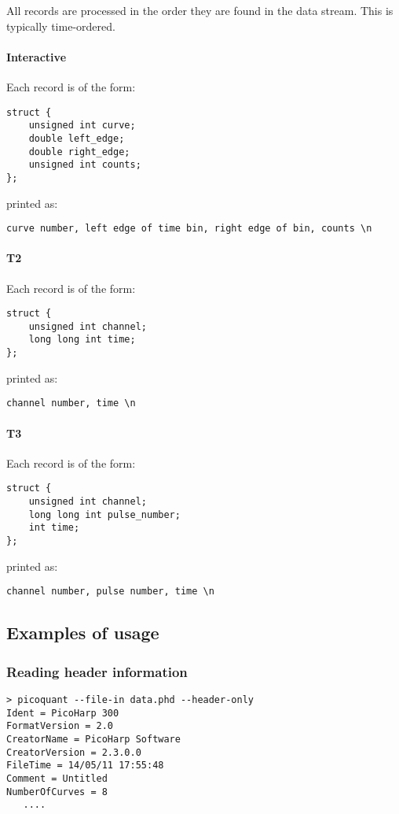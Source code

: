\documentclass{article}
\begin{document}
All records are processed in the order they are found in the data stream. This is typically time-ordered.

\paragraph{Interactive}
Each record is of the form:
\begin{verbatim}
struct {
    unsigned int curve;
    double left_edge;
    double right_edge;
    unsigned int counts;
};
\end{verbatim}
printed as:
\begin{verbatim}
curve number, left edge of time bin, right edge of bin, counts \n
\end{verbatim}

\paragraph{T2}
Each record is of the form:
\begin{verbatim}
struct {
    unsigned int channel;
    long long int time;
};
\end{verbatim}
printed as:
\begin{verbatim}
channel number, time \n
\end{verbatim}

\paragraph{T3}
Each record is of the form:
\begin{verbatim}
struct {
	unsigned int channel;
	long long int pulse_number;
	int time;
};
\end{verbatim}
printed as:
\begin{verbatim}
channel number, pulse number, time \n
\end{verbatim}
	
\subsection{Examples of usage}
\subsubsection{Reading header information}
\begin{verbatim}
> picoquant --file-in data.phd --header-only
Ident = PicoHarp 300
FormatVersion = 2.0
CreatorName = PicoHarp Software
CreatorVersion = 2.3.0.0
FileTime = 14/05/11 17:55:48
Comment = Untitled
NumberOfCurves = 8
   ....
\end{verbatim}
\end{document}
